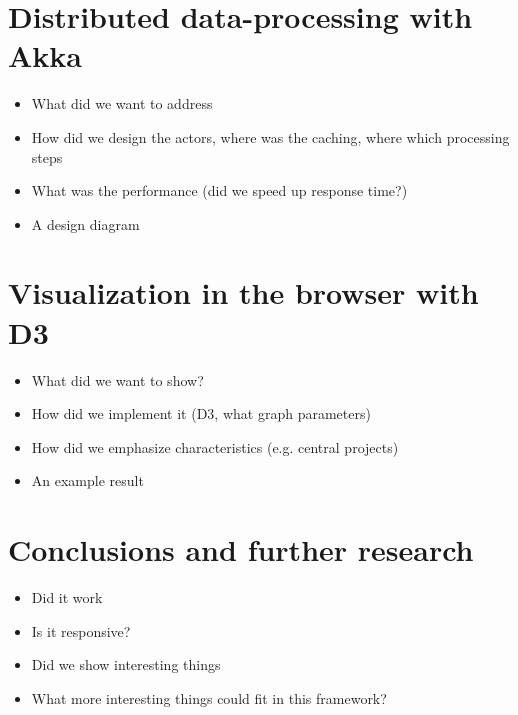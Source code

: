 \documentclass[10pt,a4paper]{article}
\begin{document}
\section{Distributed data-processing with Akka}

\begin{itemize}
    \item What did we want to address
    \item How did we design the actors, where was the caching, where which processing steps
    \item What was the performance (did we speed up response time?)
    \item A design diagram
\end{itemize}

\section{Visualization in the browser with D3}

\begin{itemize}
    \item What did we want to show?
    \item How did we implement it (D3, what graph parameters)
    \item How did we emphasize characteristics (e.g. central projects)
    \item An example result
\end{itemize}

\section{Conclusions and further research}

\begin{itemize}
    \item Did it work
    \item Is it responsive?
    \item Did we show interesting things
    \item What more interesting things could fit in this framework?
\end{itemize}
\end{document}
